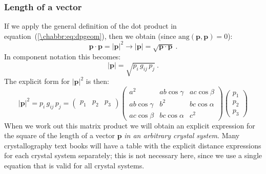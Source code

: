 \subsubsection{Length of a vector}
If we apply the general definition of the dot product in equation~(\ref{\chabbr:eq:dpgeom}), then we obtain (since $\text{ang}(\mathbf{p},\mathbf{p})=0$):
	\[
		\mathbf{p}\cdot\mathbf{p} =\vert \mathbf{p}\vert^2\rightarrow \vert\mathbf{p}\vert = \sqrt{\mathbf{p}\cdot\mathbf{p}}\ .
	\]
	In component notation this becomes:
	\begin{equation}
		\vert\mathbf{p}\vert = \sqrt{p_i\, g_{ij}\, p_j}\ .\label{\chabbr:eq:dotproduct}
	\end{equation}
	The explicit form for $\vert\mathbf{p}\vert^2$ is then:
	\[
		\vert\mathbf{p}\vert^2 = p_i\,g_{ij}\,p_j = \begin{pmatrix}p_1&p_2&p_3\end{pmatrix}\begin{pmatrix}a^2 & a b \cos\gamma & a c \cos\beta\\
	 a b \cos\gamma & b^2 & b c \cos\alpha\\
	 a c \cos\beta & b c \cos\alpha & c^2\end{pmatrix}\begin{pmatrix}p_1\\ p_2\\ p_3\end{pmatrix}
	\]
	When we work out this matrix product we will obtain an explicit expression for the square of the length of a vector $\mathbf{p}$ \textit{in an arbitrary crystal system}. Many crystallography text books will have a table with the explicit distance expressions for each crystal system separately; this is not necessary here, since we use a single equation that is valid for all crystal systems. 
	
